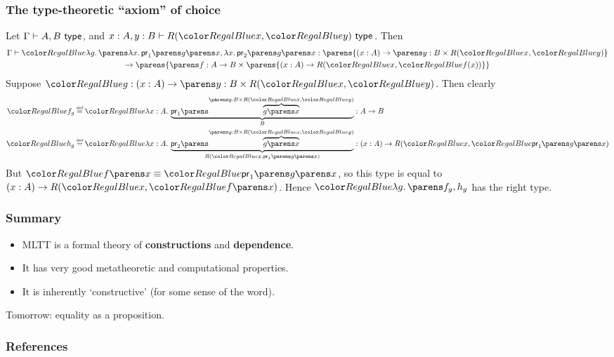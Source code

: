 \documentclass[handout]{beamer} %
\begin{document}
\begin{frame}
  \frametitle{The type-theoretic ``axiom'' of choice}
  
  Let $\IsTy{A, B}[]$, and $\IsTy[x : A, y : B]{R(\Tm{x}, \Tm{y})}[]$. Then
  \begin{multline*}
    \IsTm{
      \Lam{g}{
        \Pair{
          \Lam{x}{\Proj[1]{\App{g}{x}}}
        }{
          \Lam{x}{\Proj[2]{\App{g}{x}}}
        }
      }
    }{
      \parens{\Fn{x}{A}{\DSum{y}{B}{R(\Tm{x}, \Tm{y})}}} \\ 
      \to \parens{ \DSum{f}{A \to B}{\parens{\Fn{x}{A}{R(\Tm{x}, \Tm{f(x)})}}} }
    } 
  \end{multline*}
  Suppose $\Tm{g} : \Fn{x}{A}{\DSum{y}{B}{R(\Tm{x}, \Tm{y})}}$. Then clearly
  \begin{align*}
    \Tm{f_g} &\defeq \Tm{
      \Lam{x}[A]{
        \underbrace{\Proj[1]{\overbrace{\App{g}{x}}^{\DSum{y}{B}{R(\Tm{x}, \Tm{y})}}}}_{B}
      }
    } : A \to B 
    \\
    \Tm{h_g} &\defeq \Tm{
      \Lam{x}[A]{
        \underbrace{\Proj[2]{\overbrace{\App{g}{x}}^{\DSum{y}{B}{R(\Tm{x}, \Tm{y})}}}}_{
          R(\Tm{x}, \Proj[1]{\App{g}{x}})
        }
      } 
    } : \Fn{x}{A}{R(\Tm{x}, \Tm{\Proj[1]{\App{g}{x}}})}
  \end{align*}
  But $\Tm{\App{f}{x}} \equiv \Tm{\Proj[1]{\App{g}{x}}}$, so this type is equal
  to $\Fn{x}{A}{R(\Tm{x}, \Tm{\App{f}{x}})}$. Hence $\Tm{\Lam{g}{\Pair{f_g}{h_g}}}$ has the
  right type.
  
\end{frame}

\begin{frame}
  \frametitle{Summary}
  \begin{itemize}
    \item MLTT is a formal theory of \textbf{constructions} and \textbf{dependence}.
    \item It has very good metatheoretic and computational properties.
    \item It is inherently `constructive' (for some sense of the word).
  \end{itemize}
  
  \medskip

  Tomorrow: equality as a proposition.
  
\end{frame}

\begin{frame}
  \frametitle{References}
  
  
  \nocite{martin-lof_1975}
  \nocite{martin-lof_1984}
  \nocite{nordstrom_1990}
  \nocite{hofmann_1997}
\end{frame}
\end{document}
